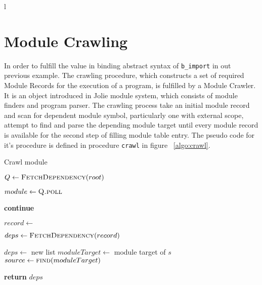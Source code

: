 l
\section{ Module Crawling }

In order to fulfill the value in binding abstract syntax of \texttt{b_import} in out previous example. The crawling procedure, which constructs a set of required Module Records for the execution of a program, is fulfilled by a Module Crawler. It is an object introduced in Jolie module system, which consists of module finders and program parser.
The crawling process take an initial module record and scan for dependent module symbol, particularly one with external scope, attempt to find and parse the depending module target until every module record is available for the second step of filling module table entry. The pseudo code for it's procedure is defined in procedure \texttt{crawl} in figure ~\ref{algo:crawl}.

\begin{algorithm}[h]
    \caption{Crawl module}
    \label{algo:crawl}
    \begin{algorithmic}[1]



        \State $Q\gets \Call{FetchDependency}{root}$ 
        \State {} 

        \State $module\gets \Call{Q.poll}{}$

        \textbf{continue} 
        \EndIf

        \State $record\gets$  

        \State $deps\gets \Call{FetchDependency}{record}$
        \State {}
        \EndIf
        \EndFor
        \State {} 

        \EndWhile
        \EndProcedure



        \State $deps\gets$ new list
        \State $moduleTarget\gets$ module target of $s$
        \State $source\gets \Call{find}{moduleTarget}$ 

        \State {}
        \EndFor

        \State \textbf{return} $deps$ 
        \EndFunction

    \end{algorithmic}
\end{algorithm}
\FloatBarrier



